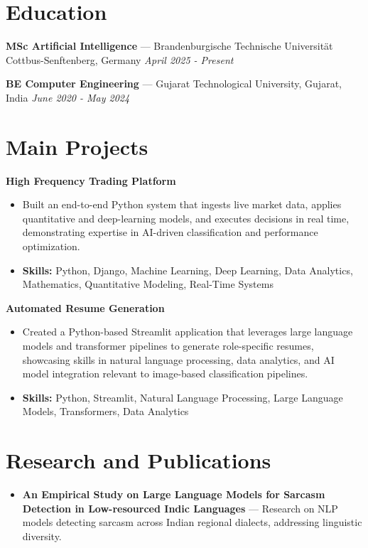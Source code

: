 \documentclass[a4paper,10pt]{article}
\begin{document}
\section*{Education}
\textbf{MSc Artificial Intelligence} — Brandenburgische Technische Universität Cottbus-Senftenberg, Germany \hfill \textit{April 2025 - Present}\par
\vspace{1.5pt}
\textbf{BE Computer Engineering} — Gujarat Technological University, Gujarat, India \hfill \textit{June 2020 - May 2024}\par

\section*{Main Projects}
\textbf{High Frequency Trading Platform}\par
\vspace{1pt}
\begin{itemize}
  \item Built an end-to-end Python system that ingests live market data, applies quantitative and deep-learning models, and executes decisions in real time, demonstrating expertise in AI-driven classification and performance optimization.
  \item \textbf{Skills:} Python, Django, Machine Learning, Deep Learning, Data Analytics, Mathematics, Quantitative Modeling, Real-Time Systems
\end{itemize}
\vspace{3pt}
\textbf{Automated Resume Generation}\par
\vspace{1pt}
\begin{itemize}
  \item Created a Python-based Streamlit application that leverages large language models and transformer pipelines to generate role-specific resumes, showcasing skills in natural language processing, data analytics, and AI model integration relevant to image-based classification pipelines.
  \item \textbf{Skills:} Python, Streamlit, Natural Language Processing, Large Language Models, Transformers, Data Analytics
\end{itemize}

\section*{Research and Publications}
\begin{itemize}
\item \textbf{An Empirical Study on Large Language Models for Sarcasm Detection in Low-resourced Indic Languages} — Research on NLP models detecting sarcasm across Indian regional dialects, addressing linguistic diversity.
\end{itemize}
\end{document}
